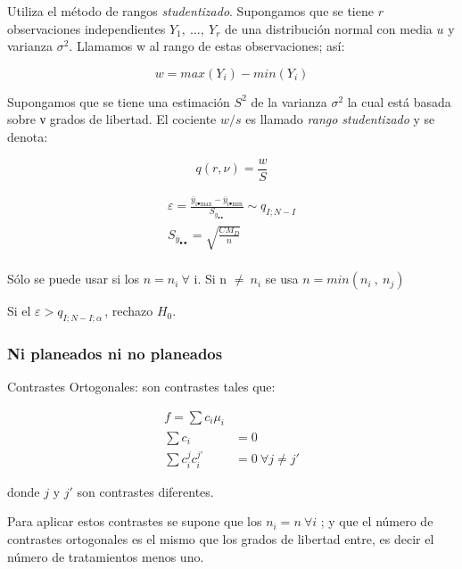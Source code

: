 \documentclass[]{book}
\theoremstyle{definition}
\theoremstyle{definition}
\theoremstyle{definition}
\theoremstyle{remark}
\begin{document}
Utiliza el método de rangos \emph{studentizado}. Supongamos que se tiene
\(r\) observaciones independientes \(Y_{1},\ \ldots,\ Y_{r}\) de una
distribución normal con media \(u\) y varianza \(\sigma^{2}\). Llamamos
w al rango de estas observaciones; así:

\[
w = max(Y_{i}) - min(Y_{i})
\]

Supongamos que se tiene una estimación \(S^{2}\) de la varianza
\(\sigma^{2}\) la cual está basada sobre ν grados de libertad. El
cociente \(w/s\) es llamado \emph{rango studentizado} y se denota:

\[
q\left( r,\nu \right) = \frac{w}{S}
\]

\[
\begin{matrix}
\varepsilon = \frac{{\overline{y}}_{\text{i}\bullet\text{max}} - {\overline{y}}_{\text{i}\bullet\text{min}}}{S_{{\overline{y}}_{\bullet\bullet}}}\sim q_{I;N - I} \\
S_{{\overline{y}}_{\bullet\bullet}} = \sqrt{\frac{CM_D}{n}} \\
\end{matrix}
\]

Sólo se puede usar si los \(n = n_{i}\ \forall\text{\ i}\). Si
\(\text{n\ } \neq \ n_{i}\) se usa \(n = min(n_{i}\ ,\ n_{j})\)

Si el \(\varepsilon > q_{I;N - I;\alpha\ }\), rechazo \(H_{0}\).

\hypertarget{ni-planeados-ni-no-planeados}{%
\subsubsection{Ni planeados ni no
planeados}\label{ni-planeados-ni-no-planeados}}

Contrastes Ortogonales: son contrastes tales que:

\begin{equation}
\begin{aligned} 
f = \sum{c_{i}\mu_{i}}\\ 
 \sum {c_{i}} &= 0 \\
 \sum{c_{i}^{j}c_{i}^{j'}} &= 0\ \forall j \neq j'
\end{aligned}
\end{equation}

donde \(j\) y \(j'\) son contrastes diferentes.

Para aplicar estos contrastes se supone que los \(n_{i} = n\ \forall i\)
; y que el número de contrastes ortogonales es el mismo que los grados
de libertad entre, es decir el número de tratamientos menos uno.
\end{document}
